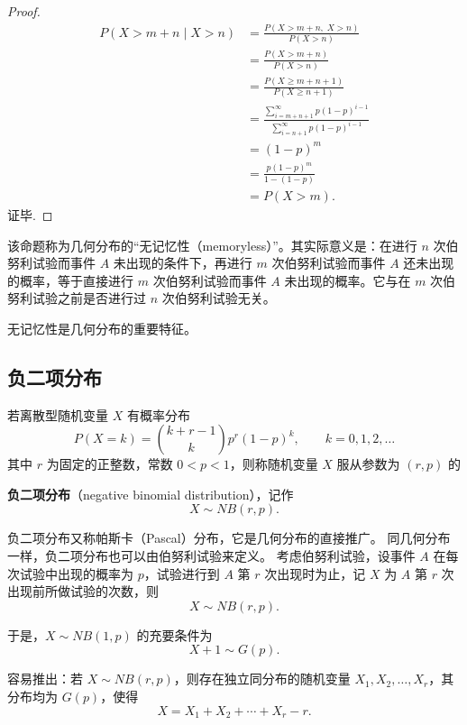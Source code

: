 \begin{proof}
\begin{align*}
P(X > m+n \mid X > n) 
&= \frac{P(X > m+n,\; X > n)}{P(X > n)} \\[6pt]
&= \frac{P(X > m+n)}{P(X > n)} \\[6pt]
&= \frac{P(X \geq m+n+1)}{P(X \geq n+1)} \\[6pt]
&= \frac{\displaystyle \sum_{i=m+n+1}^\infty p(1-p)^{i-1}}
         {\displaystyle \sum_{i=n+1}^\infty p(1-p)^{i-1}} \\[10pt]
&= (1-p)^m \\[6pt]
&= \frac{p(1-p)^m}{1-(1-p)} \\[6pt]
&= P(X > m).
\end{align*}
证毕.
\end{proof}
该命题称为几何分布的“无记忆性（memoryless）”。其实际意义是：在进行 $n$ 次伯努利试验而事件 $A$ 未出现的条件下，再进行 $m$ 次伯努利试验而事件 $A$ 还未出现的概率，等于直接进行 $m$ 次伯努利试验而事件 $A$ 未出现的概率。它与在 $m$ 次伯努利试验之前是否进行过 $n$ 次伯努利试验无关。

无记忆性是几何分布的重要特征。
\subsection{负二项分布}
\begin{proposition}[6) 负二项分布]
 
若离散型随机变量 $X$ 有概率分布
\[
P(X=k) = \binom{k+r-1}{k} p^r (1-p)^k, \qquad k=0,1,2,\dots \tag{2.1.7}
\]
其中 $r$ 为固定的正整数，常数 $0<p<1$，则称随机变量 $X$ 服从参数为 $(r,p)$ 的   
\end{proposition}


\textbf{负二项分布}（negative binomial distribution），记作
\[
X \sim NB(r,p).
\]

负二项分布又称帕斯卡（Pascal）分布，它是几何分布的直接推广。  
同几何分布一样，负二项分布也可以由伯努利试验来定义。  
考虑伯努利试验，设事件 $A$ 在每次试验中出现的概率为 $p$，试验进行到 $A$ 第 $r$ 次出现时为止，记 $X$ 为 $A$ 第 $r$ 次出现前所做试验的次数，则
\[
X \sim NB(r,p).
\]

于是，$X \sim NB(1,p)$ 的充要条件为
\[
X+1 \sim G(p).
\]

容易推出：若 $X \sim NB(r,p)$，则存在独立同分布的随机变量 $X_1,X_2,\dots,X_r$，其分布均为 $G(p)$，使得
\[
X = X_1 + X_2 + \cdots + X_r - r.
\]

